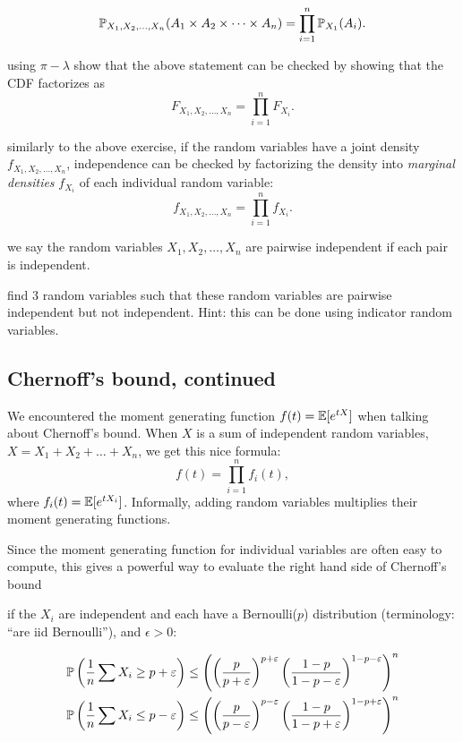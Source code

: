 \documentclass{article}
\begin{document}
 \[ \P_{X_1, X_2, \dots, X_n}(A_1 \times A_2 \times \dots \times A_n) = \prod_{i=1}^n \P_{X_1}(A_i). \]

 using $\pi-\lambda$ show that the above statement can be checked by showing that the CDF factorizes as 
\[ F_{X_1, X_2, \dots, X_n} = \prod_{i=1}^n F_{X_i}. \]

 similarly to the above exercise, if the random variables have a joint density $f_{X_1, X_2, \dots, X_n}$, independence can be checked by factorizing the density into \emph{marginal densities} $f_{X_i}$ of each individual random variable:
\[ f_{X_1, X_2, \dots, X_n} = \prod_{i=1}^n f_{X_i}. \]

 we say the random variables $X_1, X_2, \dots, X_n$ are pairwise independent if each pair is independent.

 find 3 random variables such that these random variables are pairwise independent but not independent. Hint: this can be done using indicator random variables.


\subsection{Chernoff's bound, continued}\label{sec:chernoff-revisited}

We encountered the moment generating function $f(t) = \E[e^{tX}]$ when talking about Chernoff's bound. When $X$ is a sum of independent random variables, $X = X_1 + X_2 + \dots + X_n$, we get this nice formula:
\[ f(t) = \prod_{i=1}^n f_i(t), \]
where $f_i(t) = \E[e^{tX_i}]$. Informally, adding random variables multiplies their moment generating functions.

Since the moment generating function for individual variables are often easy to compute, this gives a powerful way to evaluate the right hand side of Chernoff's bound 

 if the $X_i$ are independent and each have a Bernoulli($p$) distribution (terminology: ``are iid Bernoulli''), and $\epsilon > 0$:

\begin{align*}
	\P \left (\frac{1}{n} \sum X_i \geq p + \varepsilon \right ) &\leq \left (\left (\frac{p}{p + \varepsilon}\right )^{p+\varepsilon} {\left (\frac{1 - p}{1-p- \varepsilon}\right )}^{1 - p- \varepsilon}\right )^n  \\
	\P \left (\frac{1}{n} \sum X_i \leq p - \varepsilon \right ) &\leq \left (\left (\frac{p}{p - \varepsilon}\right )^{p-\varepsilon} {\left (\frac{1 - p}{1-p+ \varepsilon}\right )}^{1 - p+ \varepsilon}\right )^n 
\end{align*}
\end{document}
